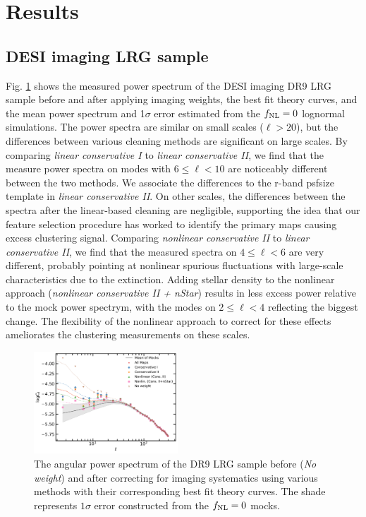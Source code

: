\section{Results}\label{sec:results}
\subsection{DESI imaging LRG sample}

Fig. \ref{fig:cl_dr9} shows the measured power spectrum of the DESI imaging DR9 LRG sample before and after applying imaging weights, the best fit theory curves, and the mean power spectrum and 1$\sigma$ error estimated from the $f_{\rm NL}=0$ lognormal simulations. The power spectra are similar on small scales ($\ell > 20$), but the differences between various cleaning methods are significant on large scales. By comparing \textit{linear conservative I} to \textit{linear conservative II}, we find that the measure power spectra on modes with $6\leq \ell < 10$ are noticeably different between the two methods. We associate the differences to the r-band psfsize template in \textit{linear conservative II}. On other scales, the differences between the spectra after the linear-based cleaning are negligible, supporting the idea that our feature selection procedure has worked to identify the primary maps causing excess clustering signal. Comparing \textit{nonlinear conservative II} to \textit{linear conservative II}, we find that the measured spectra on $4 \leq \ell < 6$ are very different, probably pointing at nonlinear spurious fluctuations with large-scale characteristics due to the extinction. Adding stellar density to the nonlinear approach (\textit{nonlinear conservative II + nStar}) results in less excess power relative to the mock power spectrym, with the modes on $2\leq \ell < 4$ reflecting the biggest change. The flexibility of the nonlinear approach to correct for these effects ameliorates the clustering measurements on these scales.

\begin{figure}
    \centering
    \includegraphics[width=0.48\textwidth]{figures/model_dr9.pdf} 
    \caption{The angular power spectrum of the DR9 LRG sample before (\textit{No weight}) and after correcting for imaging systematics using various methods with their corresponding best fit theory curves. The shade represents $1\sigma$ error constructed from the $f_{\rm NL}=0$ mocks.}
    \label{fig:cl_dr9}
\end{figure}

